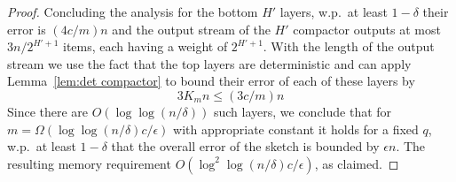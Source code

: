 \documentclass[anon,12pt]{colt2019} %
\newcommand{\eps}{\epsilon}
\begin{document}
{\begin{proof}
Concluding the analysis for the bottom $H'$ layers, w.p.\ at least $1-\delta$ their error is $(4c/m) n$ and the output stream of the $H'$ compactor outputs at most $3n/2^{H'+1}$ items, each having a weight of $2^{H'+1}$. With the length of the output stream we use the fact that the top layers are deterministic and can apply Lemma~\ref{lem:det compactor} to bound their error of each of these layers by
$$ 3K_m n \leq (3c/m) n $$
Since there are $O(\log\log(n/\delta))$ such layers, we conclude that for $m=\Omega(\log\log(n/\delta) c/\eps)$ with appropriate constant it holds for a fixed $q$, w.p.\ at least $1-\delta$ that the overall error of the sketch is bounded by $\eps n$. The resulting memory requirement $O(\log^2\log(n/\delta) c/\eps)$, as claimed.



\end{proof}







}
\end{document}
